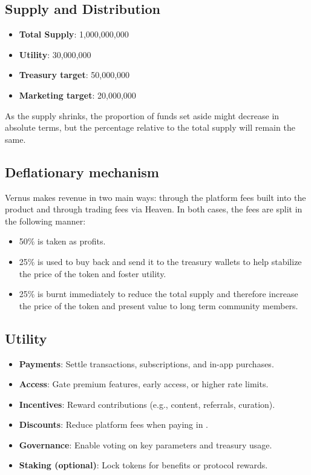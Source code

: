 \documentclass[10pt]{article}
\begin{document}
    \subsection{Supply and Distribution}
      \begin{itemize}[leftmargin=*]
        \item \textbf{Total Supply}: 1{,}000{,}000{,}000 \textbf{\tokenticker{}}
        \item \textbf{Utility}: 30{,}000{,}000 \textbf{\tokenticker{}}
        \item \textbf{Treasury target}: 50{,}000{,}000 \textbf{\tokenticker{}}
        \item \textbf{Marketing target}: 20{,}000{,}000 \textbf{\tokenticker{}}
      \end{itemize}
      As the supply shrinks, the proportion of funds set aside might decrease in absolute terms, but the percentage relative to the total supply will remain the same.

    \subsection{Deflationary mechanism}
      Vernus makes revenue in two main ways: through the platform fees built into the product and through trading fees via Heaven. In both cases, the fees are split in the following manner:
      \begin{itemize}[leftmargin=*]
        \item 50\% is taken as profits.
        \item 25\% is used to buy back \textbf{\tokenticker{}} and send it to the treasury wallets to help stabilize the price of the token and foster utility.
        \item 25\% is burnt immediately to reduce the total supply and therefore increase the price of the token and present value to long term community members.
      \end{itemize}

    \subsection{Utility}
      \begin{itemize}[leftmargin=*]
        \item \textbf{Payments}: Settle transactions, subscriptions, and in-app purchases.
        \item \textbf{Access}: Gate premium features, early access, or higher rate limits.
        \item \textbf{Incentives}: Reward contributions (e.g., content, referrals, curation).
        \item \textbf{Discounts}: Reduce platform fees when paying in \textbf{\tokenticker{}}.
        \item \textbf{Governance}: Enable voting on key parameters and treasury usage.
        \item \textbf{Staking (optional)}: Lock tokens for benefits or protocol rewards.
      \end{itemize}
\end{document}
